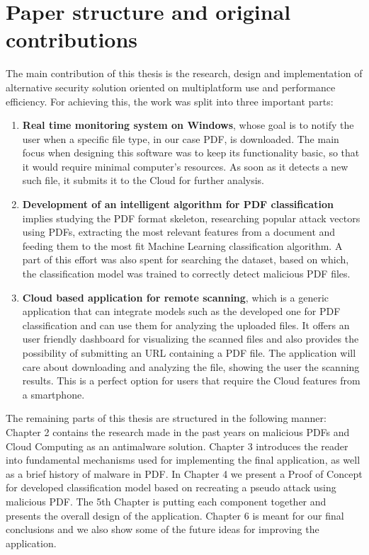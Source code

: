 \section{Paper structure and original contributions}
\label{section:structure}
The main contribution of this thesis is the research, design and implementation of alternative security solution oriented on multiplatform use and performance efficiency. For achieving this, the work was split into three important parts:
\begin{enumerate}
    \item \textbf{Real time monitoring system on Windows}, whose goal is to notify the user when a specific file type, in our case PDF, is downloaded. The main focus when designing this software was to keep its functionality basic, so that it would require minimal computer's resources. As soon as it detects a new such file, it submits it to the Cloud for further analysis.
    \item \textbf{Development of an intelligent algorithm for PDF classification} implies studying the PDF format skeleton, researching popular attack vectors using PDFs, extracting the most relevant features from a document and feeding them to the most fit Machine Learning classification algorithm. A part of this effort was also spent for searching the dataset, based on which, the classification model was trained to correctly detect malicious PDF files.
    \item \textbf{Cloud based application for remote scanning}, which is a generic application that can integrate models such as the developed one for PDF classification and can use them for analyzing the uploaded files. It offers an user friendly dashboard for visualizing the scanned files and also provides the possibility of submitting an URL containing a PDF file. The application will care about downloading and analyzing the file, showing the user the scanning results. This is a perfect option for users that require the Cloud features from a smartphone.
\end{enumerate}

The remaining parts of this thesis are structured in the following manner: Chapter 2 contains the research made in the past years on malicious PDFs and Cloud Computing as an antimalware solution. Chapter 3 introduces the reader into fundamental mechanisms used for implementing the final application, as well as a brief history of malware in PDF. In Chapter 4 we present a Proof of Concept for developed classification model based on recreating a pseudo attack using malicious PDF. The 5th Chapter is putting each component together and presents the overall design of the application. Chapter 6 is meant for our final conclusions and we also show some of the future ideas for improving the application.

